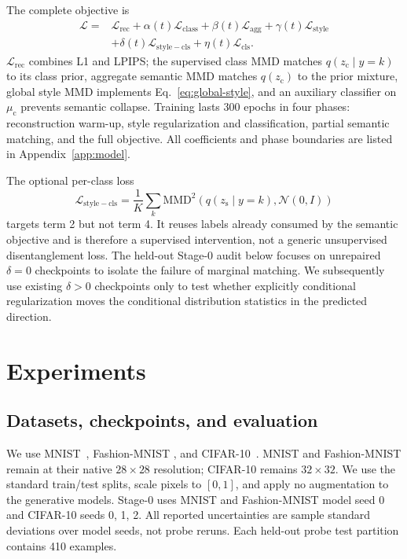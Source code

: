 \documentclass{article}
\newcommand{\zc}{z_{\mathrm{c}}}
\newcommand{\zs}{z_{\mathrm{s}}}
\newcommand{\muc}{\mu_{\mathrm{c}}}
\newcommand{\MMD}{\mathrm{MMD}}
\begin{document}
The complete objective is
\begin{align}
\mathcal L={}&\mathcal L_{\mathrm{rec}}
+\alpha(t)\mathcal L_{\mathrm{class}}
+\beta(t)\mathcal L_{\mathrm{agg}}
+\gamma(t)\mathcal L_{\mathrm{style}}\nonumber\\
&+\delta(t)\mathcal L_{\mathrm{style-cls}}
+\eta(t)\mathcal L_{\mathrm{cls}}.
\label{eq:objective}
\end{align}
$\mathcal L_{\mathrm{rec}}$ combines L1 and LPIPS; the supervised class MMD
matches $q(\zc\mid y=k)$ to its class prior, aggregate semantic MMD matches
$q(\zc)$ to the prior mixture, global style MMD implements
Eq.~\ref{eq:global-style}, and an auxiliary classifier on $\muc$ prevents
semantic collapse.  Training lasts 300 epochs in four phases: reconstruction
warm-up, style regularization and classification, partial semantic matching,
and the full objective.  All coefficients and phase boundaries are listed in
Appendix~\ref{app:model}.

The optional per-class loss
\begin{equation}
\mathcal L_{\mathrm{style-cls}}=
\frac1K\sum_k\MMD^2(q(\zs\mid y=k),\mathcal N(0,I))
\label{eq:perclass}
\end{equation}
targets term 2 but not term 4.  It reuses labels already consumed by the
semantic objective and is therefore a supervised intervention, not a generic
unsupervised disentanglement loss.  The held-out Stage-0 audit below focuses
on unrepaired $\delta=0$ checkpoints to isolate the failure of marginal
matching.  We subsequently use existing $\delta>0$ checkpoints only to test
whether explicitly conditional regularization moves the conditional
distribution statistics in the predicted direction.

\section{Experiments}
\label{sec:experiments}

\subsection{Datasets, checkpoints, and evaluation}

We use MNIST~\citep{lecun1998gradient}, Fashion-MNIST
\citep{xiao2017fashion}, and CIFAR-10~\citep{krizhevsky2009learning}.  MNIST
and Fashion-MNIST remain at their native $28\times28$ resolution; CIFAR-10
remains $32\times32$.  We use the standard train/test splits, scale pixels to
$[0,1]$, and apply no augmentation to the generative models.  Stage-0 uses
MNIST and Fashion-MNIST model seed 0 and CIFAR-10 seeds 0, 1, 2.  All reported
uncertainties are sample standard deviations over model seeds, not probe
reruns.  Each held-out probe test partition contains 410 examples.
\end{document}
